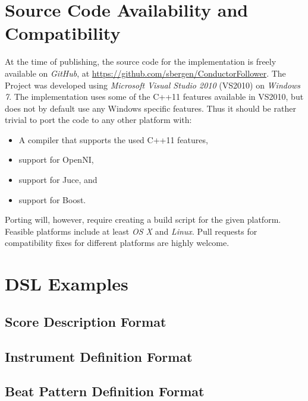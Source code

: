 \chapter{Source Code Availability and Compatibility}

At the time of publishing,
the source code for the implementation is freely
available on \textit{GitHub},
at \url{https://github.com/sbergen/ConductorFollower}.
The Project was developed using
\textit{Microsoft Visual Studio 2010} (VS2010)
on \textit{Windows 7}.
The implementation uses some of the C++11 features
available in VS2010, but does not by default use any
Windows specific features.
Thus it should be rather trivial to port
the code to any other platform with:
\begin{itemize}
\item A compiler that supports the used C++11 features,
\item support for OpenNI,
\item support for Juce, and
\item support for Boost.
\end{itemize}
Porting will, however,
require creating a build script for the given platform.
Feasible platforms include at least
\textit{OS X} and \textit{Linux}.
Pull requests for compatibility fixes for different platforms
are highly welcome.

\chapter{DSL Examples}
\label{appendix:dsl_samples}

\section{Score Description Format}



\section{Instrument Definition Format}



\section{Beat Pattern Definition Format}


